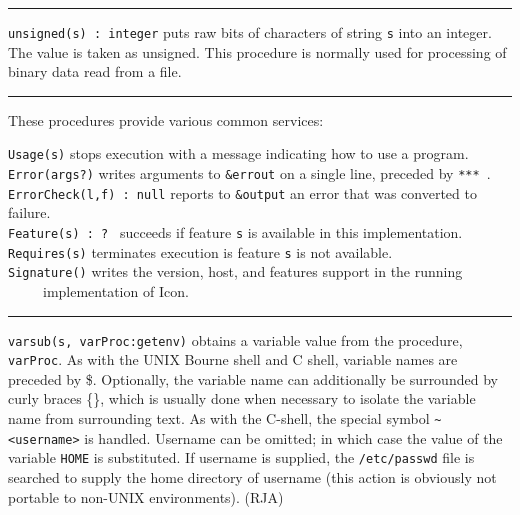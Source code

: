 \vspace{0.25cm}\hrule{}

\texttt{unsigned(s) : integer} puts raw bits of characters of string
\texttt{s} into an integer. The value is taken as unsigned. This
procedure is normally used for processing of binary data read from a
file.

\vspace{0.25cm}\hrule{}

These procedures provide various common services: 

\texttt{Usage(s)} stops execution with a message
indicating how to use a program.\\
\texttt{Error(args?)} writes arguments to \texttt{\&errout} on a single
line, preceded by \texttt{{\textquotedbl}*** {\textquotedbl}}.\\
\texttt{ErrorCheck(l,f) : null} reports to \texttt{\&output} an error
that was converted to failure.\\
\texttt{Feature(s)}\texttt{ : ?} \ succeeds if feature
\texttt{s} is available in this implementation.\\
\texttt{Requires(s)} terminates execution is feature \texttt{s} is not
available.\\
\texttt{Signature()} writes the version, host, and features support in
the running\\
 \ \ \ \ \ implementation of Icon. 

\vspace{0.25cm}\hrule{}

\texttt{varsub(s, varProc:getenv)} obtains a variable value from the
procedure, \texttt{varProc}. As with the UNIX Bourne shell and C shell,
variable names are preceded by \$. Optionally, the variable name can
additionally be surrounded by curly braces \{\}, which is usually done
when necessary to isolate the variable name from surrounding text. As
with the C-shell, the special symbol
\texttt{\~{}{\textless}username{\textgreater}} is handled. Username can
be omitted; in which case the value of the variable \texttt{HOME} is
substituted. If username is supplied, the \texttt{/etc/passwd} file is
searched to supply the home directory of username (this action is
obviously not portable to non-UNIX environments). (RJA)

